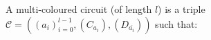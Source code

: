 \documentclass[preview]{standalone}
\begin{document}
\begin{center}
\raggedright A multi-coloured circuit (of length $l$) is a triple $\mathcal{C} = ((a_i)_{i=0}^{l-1}, (C_{a_i}), (D_{\overline{a_i}}))$ such that:
\end{center}
\end{document}
